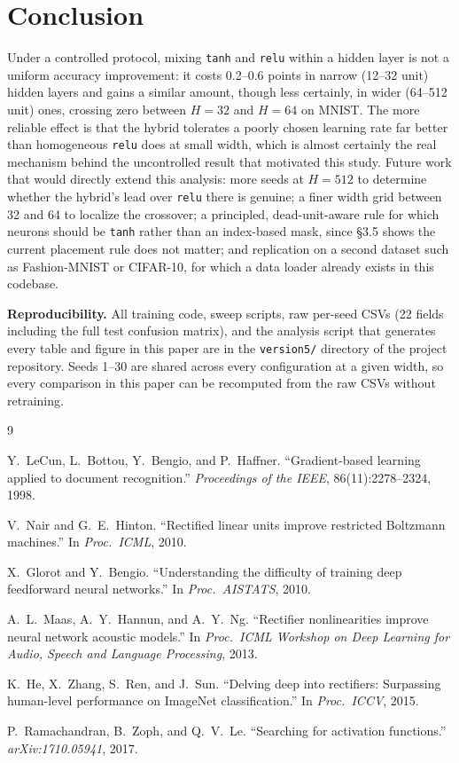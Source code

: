 \documentclass[9pt]{extarticle}
\begin{document}
\section{Conclusion}
Under a controlled protocol, mixing \texttt{tanh} and \texttt{relu} within a
hidden layer is not a uniform accuracy improvement: it costs 0.2--0.6 points
in narrow (12--32 unit) hidden layers and gains a similar amount, though less
certainly, in wider (64--512 unit) ones, crossing zero between \(H{=}32\) and
\(H{=}64\) on MNIST. The more reliable effect is that the hybrid tolerates a
poorly chosen learning rate far better than homogeneous \texttt{relu} does at
small width, which is almost certainly the real mechanism behind the
uncontrolled result that motivated this study. Future work that would
directly extend this analysis: more seeds at \(H{=}512\) to determine whether
the hybrid's lead over \texttt{relu} there is genuine; a finer width grid
between 32 and 64 to localize the crossover; a principled, dead-unit-aware
rule for which neurons should be \texttt{tanh} rather than an index-based
mask, since \S3.5 shows the current placement rule does not matter; and
replication on a second dataset such as Fashion-MNIST or CIFAR-10, for which
a data loader already exists in this codebase.

\vspace{2pt}
{\small\noindent\textbf{Reproducibility.} All training code, sweep scripts,
raw per-seed CSVs (22 fields including the full test confusion matrix), and
the analysis script that generates every table and figure in this paper are
in the \texttt{version5/} directory of the project repository. Seeds 1--30
are shared across every configuration at a given width, so every comparison
in this paper can be recomputed from the raw CSVs without retraining.}

\begin{thebibliography}{9}\small
\setlength{\itemsep}{0pt}

 Y.\ LeCun, L.\ Bottou, Y.\ Bengio, and P.\ Haffner.
``Gradient-based learning applied to document recognition.''
\emph{Proceedings of the IEEE}, 86(11):2278--2324, 1998.

 V.\ Nair and G.\ E.\ Hinton. ``Rectified linear units
improve restricted Boltzmann machines.'' In \emph{Proc.\ ICML}, 2010.

 X.\ Glorot and Y.\ Bengio. ``Understanding the
difficulty of training deep feedforward neural networks.'' In \emph{Proc.\
AISTATS}, 2010.

 A.\ L.\ Maas, A.\ Y.\ Hannun, and A.\ Y.\ Ng. ``Rectifier
nonlinearities improve neural network acoustic models.'' In \emph{Proc.\
ICML Workshop on Deep Learning for Audio, Speech and Language Processing},
2013.

 K.\ He, X.\ Zhang, S.\ Ren, and J.\ Sun. ``Delving deep into
rectifiers: Surpassing human-level performance on ImageNet classification.''
In \emph{Proc.\ ICCV}, 2015.

 P.\ Ramachandran, B.\ Zoph, and Q.\ V.\ Le.
``Searching for activation functions.'' \emph{arXiv:1710.05941}, 2017.

\end{thebibliography}
\end{document}
